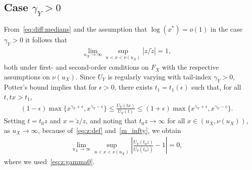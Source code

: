 \documentclass{statsoc}
\theoremstyle{break}
\newcommand{\beam}{\begin{eqnarray}}
\newcommand{\eeam}{\end{eqnarray}\noindent}
\begin{document}
\subsection*{Case $\gamma_Y > 0$} 

From~\eqref{eq:diff:medians} and the assumption that $\log(x^*) = o(1)$ in the case $\gamma_Y > 0$ it follows that 
\beam \label{eq:z:gamma0} 
	\lim_{u_X \to \infty} \sup_{ u < x < \nu(u_X)} | z/ \tilde z | = 1,
\eeam 
both under first- and second-order conditions on $F_X$ with the respective assumptions on $\nu(u_X)$.
Since $U_Y$ is regularly varying with tail-index $\gamma_Y>0$, Potter's bound \cite[Proposition B.1.9]{dehaan:ferreira:2006} implies that for $\epsilon > 0$, there exists $ t_1 = t_1(\epsilon)$ such that, for all $t, tx > t_1$,
\begin{align}\label{eq:pott:bounds}
	(1-\epsilon) \max\{ x^{\gamma_Y + \epsilon}, x^{\gamma_Y - \epsilon}\} \leq  \frac{U_Y(tx)}{ U_Y(t)} \leq (1+\epsilon) \max\{ x^{\gamma_Y + \epsilon}, x^{\gamma_Y - \epsilon}\}.
\end{align}
Setting $t = t_0 z$ and $x = \tilde z/z$, and noting that $t_0 z \to \infty$ for all $x \in (u_X, \nu(u_X))$, as $u_X\to\infty$, because of~\eqref{eq:z:def} and~\eqref{m_infty}, we obtain   
\begin{align}\label{eq:bound:approx:med:gamma:positive}
	\lim_{u_X \to \infty}  \sup_{u < x < \nu(u_X)} \left| \frac{U_Y(t_0 z )}{ U_Y(t_0 \tilde z)} - 1 \right| = 0,
\end{align}
where we used~\eqref{eq:z:gamma0}.
\end{document}
